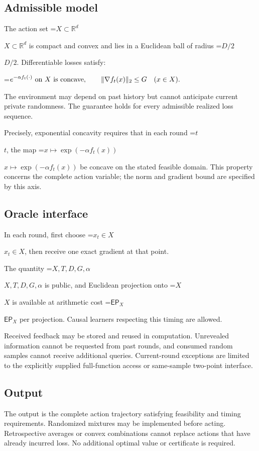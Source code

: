 \documentclass[10pt,a4paper]{article}
\newcommand{\AtlasMath}[1]{\par\begingroup\centering\setbox0=\hbox{$\displaystyle #1$}\ifdim\wd0>1.4\linewidth\typeout{ATLAS WIDE FORMULA: \the\wd0}\fi\ifdim\wd0>\linewidth\resizebox{\linewidth}{!}{\box0}\else\box0\fi\par\endgroup}
\newcommand{\AtlasInlineMath}[1]{\begingroup\setbox0=\hbox{$#1$}\ifdim\wd0>.4\linewidth\endgroup\AtlasMath{#1}\else\endgroup$#1$\fi}
\begin{document}
\subsection{Admissible model}
The action set \AtlasInlineMath{X\subset\mathbb{R}^d} is compact and convex and lies in a Euclidean ball of radius \AtlasInlineMath{D/2}. Differentiable losses satisfy:


\AtlasMath{e^{-\alpha f_t(\cdot)}\ \text{\text{on} }X\text{ \text{is concave}},\qquad \|\nabla f_t(x)\|_2\le G\quad(x\in X).}


The environment may depend on past history but cannot anticipate current private randomness. The guarantee holds for every admissible realized loss sequence.

Precisely, exponential concavity requires that in each round \AtlasInlineMath{t}, the map \AtlasInlineMath{x\mapsto\exp(-\alpha f_t(x))} be concave on the stated feasible domain. This property concerns the complete action variable; the norm and gradient bound are specified by this axis.

\subsection{Oracle interface}
In each round, first choose \AtlasInlineMath{x_t\in X}, then receive one exact gradient at that point.

The quantity \AtlasInlineMath{X,T,D,G,\alpha} is public, and Euclidean projection onto \AtlasInlineMath{X} is available at arithmetic cost \AtlasInlineMath{\mathsf{EP}_X} per projection. Causal learners respecting this timing are allowed.

Received feedback may be stored and reused in computation. Unrevealed information cannot be requested from past rounds, and consumed random samples cannot receive additional queries. Current-round exceptions are limited to the explicitly supplied full-function access or same-sample two-point interface.

\subsection{Output}
The output is the complete action trajectory satisfying feasibility and timing requirements. Randomized mixtures may be implemented before acting. Retrospective averages or convex combinations cannot replace actions that have already incurred loss. No additional optimal value or certificate is required.
\end{document}
